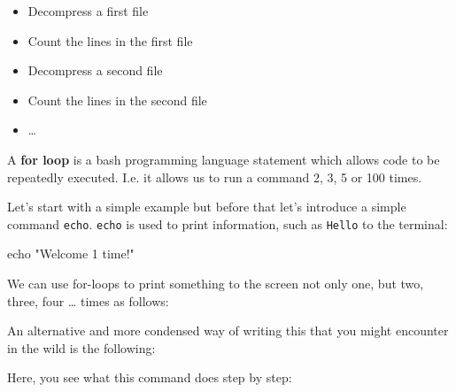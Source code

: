 \documentclass[
  letterpaper,
  DIV=11,
  numbers=noendperiod]{scrreprt}
\newenvironment{Shaded}{}{}
\newcommand{\BuiltInTok}[1]{\textcolor[rgb]{0.84,0.23,0.29}{#1}}
\newcommand{\ControlFlowTok}[1]{\textcolor[rgb]{0.84,0.23,0.29}{#1}}
\newcommand{\KeywordTok}[1]{\textcolor[rgb]{0.84,0.23,0.29}{#1}}
\newcommand{\NormalTok}[1]{\textcolor[rgb]{0.14,0.16,0.18}{#1}}
\newcommand{\StringTok}[1]{\textcolor[rgb]{0.01,0.18,0.38}{#1}}
\newcommand{\VariableTok}[1]{\textcolor[rgb]{0.89,0.38,0.04}{#1}}
\providecommand{\tightlist}{%
  \setlength{\itemsep}{0pt}\setlength{\parskip}{0pt}}\usepackage{longtable,booktabs,array}
\begin{document}
\begin{itemize}
\tightlist
\item
  Decompress a first file
\item
  Count the lines in the first file
\item
  Decompress a second file
\item
  Count the lines in the second file
\item
  \ldots{}
\end{itemize}

A \textbf{for loop} is a bash programming language statement which
allows code to be repeatedly executed. I.e. it allows us to run a
command 2, 3, 5 or 100 times.

Let's start with a simple example but before that let's introduce a
simple command \texttt{echo}. \texttt{echo} is used to print
information, such as \texttt{Hello} to the terminal:

\begin{Shaded}
\begin{Highlighting}[]
\BuiltInTok{echo} \StringTok{"Welcome 1 time!"}
\end{Highlighting}
\end{Shaded}

We can use for-loops to print something to the screen not only one, but
two, three, four \ldots{} times as follows:

\begin{Shaded}
\end{Shaded}

An alternative and more condensed way of writing this that you might
encounter in the wild is the following:

\begin{Shaded}
\end{Shaded}

Here, you see what this command does step by step:
\end{document}
